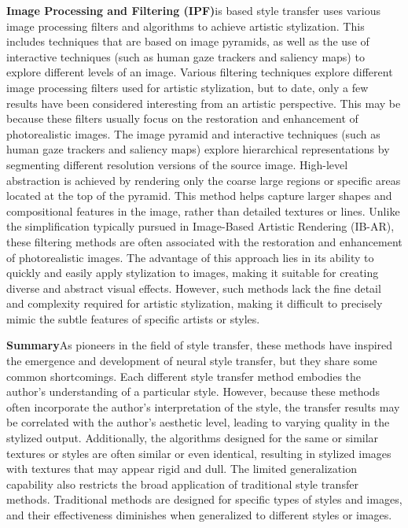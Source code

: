 \documentclass[preprint,12pt]{elsarticle}
\begin{document}
\textbf{Image Processing and Filtering (IPF)}is based style transfer uses various image processing filters and algorithms to achieve artistic stylization. This includes techniques that are based on image pyramids, as well as the use of interactive techniques (such as human gaze trackers and saliency maps) to explore different levels of an image. Various filtering techniques explore different image processing filters used for artistic stylization, but to date, only a few results have been considered interesting from an artistic perspective. This may be because these filters usually focus on the restoration and enhancement of photorealistic images. The image pyramid and interactive techniques (such as human gaze trackers and saliency maps) explore hierarchical representations by segmenting different resolution versions of the source image. High-level abstraction is achieved by rendering only the coarse large regions or specific areas located at the top of the pyramid. This method helps capture larger shapes and compositional features in the image, rather than detailed textures or lines. Unlike the simplification typically pursued in Image-Based Artistic Rendering (IB-AR), these filtering methods are often associated with the restoration and enhancement of photorealistic images. The advantage of this approach lies in its ability to quickly and easily apply stylization to images, making it suitable for creating diverse and abstract visual effects. However, such methods lack the fine detail and complexity required for artistic stylization, making it difficult to precisely mimic the subtle features of specific artists or styles.

\textbf{Summary}\quad As pioneers in the field of style transfer, these methods have inspired the emergence and development of neural style transfer, but they share some common shortcomings. Each different style transfer method embodies the author's understanding of a particular style. However, because these methods often incorporate the author's interpretation of the style, the transfer results may be correlated with the author's aesthetic level, leading to varying quality in the stylized output. Additionally, the algorithms designed for the same or similar textures or styles are often similar or even identical, resulting in stylized images with textures that may appear rigid and dull. The limited generalization capability also restricts the broad application of traditional style transfer methods. Traditional methods are designed for specific types of styles and images, and their effectiveness diminishes when generalized to different styles or images.
\end{document}
